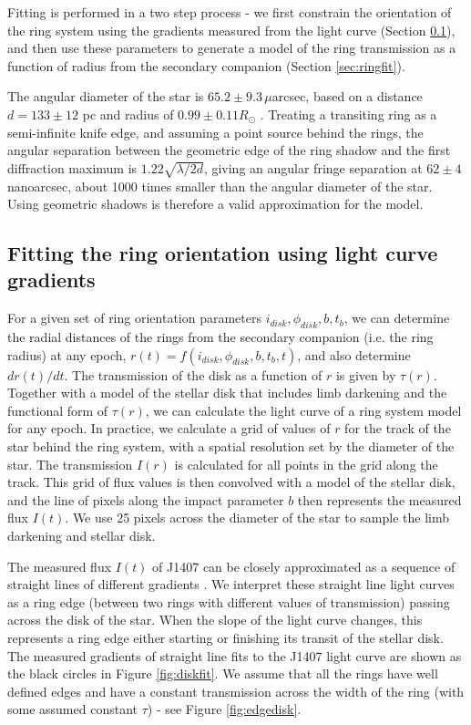 \documentclass{emulateapj}
\newcommand{\id}{i_{disk}}
\newcommand{\pd}{\phi_{disk}}
\newcommand{\taur}{\tau(r)}
\begin{document}
Fitting is performed in a two step process - we first constrain the
orientation of the ring system using the gradients measured from the
light curve (Section \ref{sec:gradfit}), and then use these parameters
to generate a model of the ring transmission as a function of radius
from the secondary companion (Section \ref{sec:ringfit}).


The angular diameter of the star is $65.2\pm9.3\,\mu$arcsec, based on
a distance $d=133\pm 12$ pc and radius of $0.99\pm 0.11 R_\odot$
\citep{vanWerkhoven14,Kenworthy15}.
Treating a transiting ring as a semi-infinite knife edge, and assuming a
point source behind the rings, the angular separation between the
geometric edge of the ring shadow and the first diffraction maximum is
$1.22 \surd{\lambda/2d}$, giving an angular fringe separation at
$62\pm4\,$ nanoarcsec, about 1000 times smaller than the angular
diameter of the star.
Using geometric shadows is therefore a valid approximation for the model.

\subsection{Fitting the ring orientation using light curve gradients}
\label{sec:gradfit}

For a given set of ring orientation parameters $\id,\pd,b,t_b$, we can
determine the radial distances of the rings from the secondary companion
(i.e. the ring radius) at any epoch, $r(t)=f(\id,\pd,b,t_b,t)$, and also
determine $dr(t)/dt$.
The transmission of the disk as a function of $r$ is given by $\taur$.
Together with a model of the stellar disk that includes limb darkening
\citep[see ][]{vanWerkhoven14} and the functional form of $\taur$, we
can calculate the light curve of a ring system model for any epoch.
In practice, we calculate a grid of values of $r$ for the track of the
star behind the ring system, with a spatial resolution set by the
diameter of the star.
The transmission $I(r)$ is calculated for all points in the grid along
the track.
This grid of flux values is then convolved with a model of the stellar
disk, and the line of pixels along the impact parameter $b$ then
represents the measured flux $I(t)$.
We use 25 pixels across the diameter of the star to sample the limb
darkening and stellar disk.

The measured flux $I(t)$ of J1407 can be closely approximated as a
sequence of straight lines of different gradients \citep[see ][ for
details]{vanWerkhoven14}.
We interpret these straight line light curves as a ring edge (between
two rings with different values of transmission) passing across the disk
of the star.
When the slope of the light curve changes, this represents a ring edge
either starting or finishing its transit of the stellar disk.
The measured gradients of straight line fits to the J1407 light curve
are shown as the black circles in Figure \ref{fig:diskfit}.
We assume that all the rings have well defined edges and have a constant
transmission across the width of the ring (with some assumed constant
$\tau$) - see Figure \ref{fig:edgedisk}.
\end{document}
